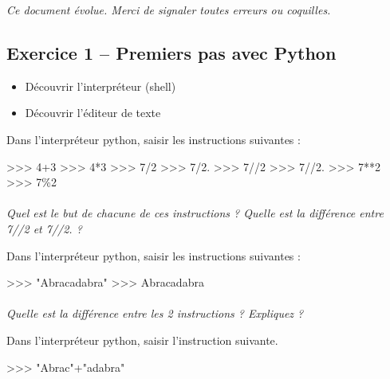 \documentclass[11pt,oneside]{article}
\begin{document}
\setlength{\parskip}{0ex plus 0.2ex minus 0ex}
 \renewcommand{\contentsname}{}
 \renewcommand{\baselinestretch}{1}

\tableofcontents

 \renewcommand{\baselinestretch}{1.2}
\setlength{\parskip}{2ex plus 0.5ex minus 0.2ex}


\textit{Ce document évolue. Merci de signaler toutes erreurs ou coquilles.}



\subsection*{Exercice 1 -- Premiers pas avec Python}
\begin{obj}
\begin{itemize}
\item Découvrir l'interpréteur (\textsf{shell})
\item Découvrir l'éditeur de texte
\end{itemize}
\end{obj}



Dans l'interpréteur python, saisir les instructions suivantes :
\begin{py}
\begin{python}
>>> 4+3
>>> 4*3
>>> 7/2
>>> 7/2.
>>> 7//2
>>> 7//2.
>>> 7**2
>>> 7\%2
\end{python}
\end{py}

\paragraph{}
\textit{Quel est le but de chacune de ces instructions ? Quelle est la différence entre \textsf{7//2} et \textsf{7//2.} ?}

Dans l'interpréteur python, saisir les instructions suivantes :
\begin{py}
\begin{python}
>>> "Abracadabra"
>>> Abracadabra
\end{python}
\end{py}

\paragraph{}
\textit{Quelle est la différence entre les 2 instructions ? Expliquez ?}


Dans l'interpréteur python, saisir l'instruction suivante.
\begin{py}
\begin{python}
>>> "Abrac"+"adabra"
\end{python}
\end{py}
\end{document}
